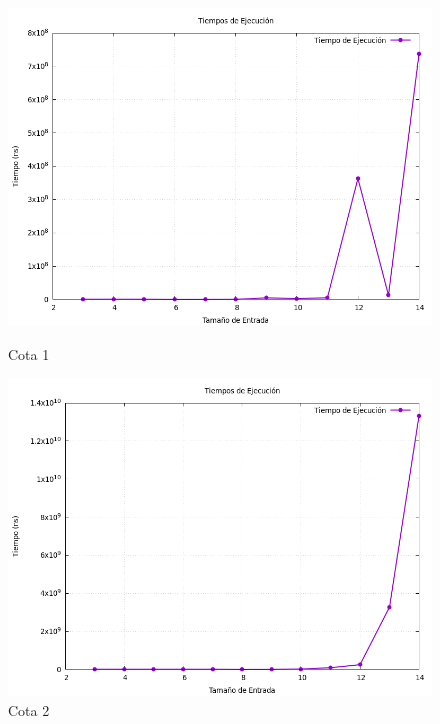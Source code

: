 \documentclass[11pt,openany]{book}
\begin{document}
\begin{figure}[H]
      \centering
      \begin{minipage}{.48\textwidth}
            \centering
            \includegraphics[width=1\linewidth]{assets/Img/Cota_1_BB/grafico_tiempos.png}
            \caption{Cota 1}
            \label{fig:Cota 1}
      \end{minipage}%
      \begin{minipage}{.48\textwidth}
            \centering
            \includegraphics[width=1\linewidth]{assets/Img/Cota_2_BB/grafico_tiempos.png}
            \caption{Cota 2}
            \label{fig:Cota 2}
      \end{minipage}
\end{figure}
\end{document}
